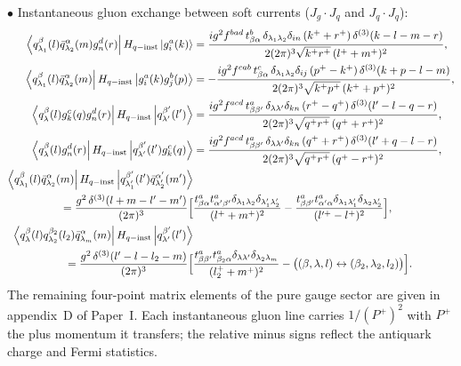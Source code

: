 $\bullet$ Instantaneous gluon exchange between soft currents ($J_{g}\cdot J_{q}$ and $J_{q}\cdot J_{q}$):
{\small\begin{align}
\left\langle q^{\beta}_{\lambda_{1}}(l)\bar q^{\alpha}_{\lambda_{2}}(m)g^{d}_{n}(r)\right|H_{q-{\rm inst}}\left|g^{a}_{i}(k)\right\rangle&=
\frac{ig^{2}f^{bad}\,t^{b}_{\beta\alpha}\,\delta_{\lambda_{1}\lambda_{2}}\delta_{in}\,(k^{+}+r^{+})\,\delta^{(3)}(k-l-m-r)}
{2(2\pi)^{3}\sqrt{k^{+}r^{+}}\,(l^{+}+m^{+})^{2}},
\label{eq:MEJJ1}\\
\left\langle q^{\beta}_{\lambda_{1}}(l)\bar q^{\alpha}_{\lambda_{2}}(m)\right|H_{q-{\rm inst}}\left|g^{a}_{i}(k)g^{b}_{j}(p)\right\rangle&=
-\frac{ig^{2}f^{cab}\,t^{c}_{\beta\alpha}\,\delta_{\lambda_{1}\lambda_{2}}\delta_{ij}\,(p^{+}-k^{+})\,\delta^{(3)}(k+p-l-m)}
{2(2\pi)^{3}\sqrt{k^{+}p^{+}}\,(k^{+}+p^{+})^{2}},
\label{eq:MEJJ2}\\
\left\langle q^{\beta}_{\lambda}(l)g^{c}_{k}(q)g^{d}_{n}(r)\right|H_{q-{\rm inst}}\left|q^{\beta'}_{\lambda'}(l')\right\rangle&=
\frac{ig^{2}f^{acd}\,t^{a}_{\beta\beta'}\,\delta_{\lambda\lambda'}\delta_{kn}\,(r^{+}-q^{+})\,\delta^{(3)}(l'-l-q-r)}
{2(2\pi)^{3}\sqrt{q^{+}r^{+}}\,(q^{+}+r^{+})^{2}},
\label{eq:MEJJq2g}\\
\left\langle q^{\beta}_{\lambda}(l)g^{d}_{n}(r)\right|H_{q-{\rm inst}}\left|q^{\beta'}_{\lambda'}(l')g^{c}_{k}(q)\right\rangle&=
\frac{ig^{2}f^{acd}\,t^{a}_{\beta\beta'}\,\delta_{\lambda\lambda'}\delta_{kn}\,(q^{+}+r^{+})\,\delta^{(3)}(l'+q-l-r)}
{2(2\pi)^{3}\sqrt{q^{+}r^{+}}\,(q^{+}-r^{+})^{2}},
\label{eq:MEJJqg}\\
\left\langle q^{\beta}_{\lambda_{1}}(l)\bar q^{\alpha}_{\lambda_{2}}(m)\right|H_{q-{\rm inst}}\left|q^{\beta'}_{\lambda_{1}'}(l')\bar q^{\alpha'}_{\lambda_{2}'}(m')\right\rangle&
\nonumber\\
=\frac{g^{2}\,\delta^{(3)}(l+m-l'-m')}{(2\pi)^{3}}\Big[&
\frac{t^{a}_{\beta\alpha}t^{a}_{\alpha'\beta'}\delta_{\lambda_{1}\lambda_{2}}\delta_{\lambda_{1}'\lambda_{2}'}}{(l^{+}+m^{+})^{2}}
-\frac{t^{a}_{\beta\beta'}t^{a}_{\alpha'\alpha}\delta_{\lambda_{1}\lambda_{1}'}\delta_{\lambda_{2}\lambda_{2}'}}{(l'^{+}-l^{+})^{2}}\Big],
\label{eq:MEJJqq}\\
\left\langle q^{\beta}_{\lambda}(l)q^{\beta_{2}}_{\lambda_{2}}(l_{2})\bar q^{\alpha}_{\lambda_{m}}(m)\right|H_{q-{\rm inst}}\left|q^{\beta'}_{\lambda'}(l')\right\rangle&
\nonumber\\
=\frac{g^{2}\,\delta^{(3)}(l'-l-l_{2}-m)}{(2\pi)^{3}}\Big[&
\frac{t^{a}_{\beta\beta'}t^{a}_{\beta_{2}\alpha}\delta_{\lambda\lambda'}\delta_{\lambda_{2}\lambda_{m}}}{(l_{2}^{+}+m^{+})^{2}}
-\big((\beta,\lambda,l)\leftrightarrow(\beta_{2},\lambda_{2},l_{2})\big)\Big].
\label{eq:MEJJqqq}
\end{align}}
The remaining four-point matrix elements of the pure gauge sector are given in appendix~D of
Paper~I. Each instantaneous gluon line carries $1/(P^{+})^{2}$ with $P^{+}$ the plus momentum it
transfers; the relative minus signs reflect the antiquark charge and Fermi statistics.

